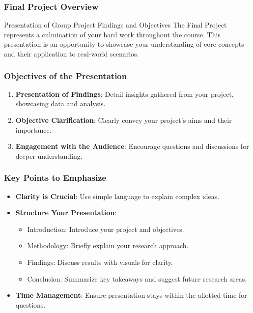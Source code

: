 \documentclass[aspectratio=169]{beamer}
\begin{document}
\frame{\titlepage}

\begin{frame}[fragile]
    \frametitle{Final Project Overview}
    \begin{block}{Presentation of Group Project Findings and Objectives}
        The Final Project represents a culmination of your hard work throughout the course. 
        This presentation is an opportunity to showcase your understanding of core concepts 
        and their application to real-world scenarios.
    \end{block}
\end{frame}

\begin{frame}[fragile]
    \frametitle{Objectives of the Presentation}
    \begin{enumerate}
        \item \textbf{Presentation of Findings}: Detail insights gathered from your project, showcasing data and analysis.
        \item \textbf{Objective Clarification}: Clearly convey your project's aims and their importance.
        \item \textbf{Engagement with the Audience}: Encourage questions and discussions for deeper understanding.
    \end{enumerate}
\end{frame}

\begin{frame}[fragile]
    \frametitle{Key Points to Emphasize}
    \begin{itemize}
        \item \textbf{Clarity is Crucial}: Use simple language to explain complex ideas. 
        \item \textbf{Structure Your Presentation}:
        \begin{itemize}
            \item Introduction: Introduce your project and objectives.
            \item Methodology: Briefly explain your research approach.
            \item Findings: Discuss results with visuals for clarity.
            \item Conclusion: Summarize key takeaways and suggest future research areas.
        \end{itemize}
        \item \textbf{Time Management}: Ensure presentation stays within the allotted time for questions.
    \end{itemize}
\end{frame}
\end{document}
